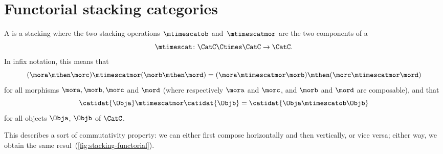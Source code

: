 
\section{Functorial stacking categories}
\label{sec:functorial-stacking}

\begin{ctdefinition}
    \label{def:functorial-stacking-cat}
    A  is a stacking  where the two stacking operations~$\mtimescatob$ and~$\mtimescatmor$ are the two components of a  \begin{equation}
        \mtimescat\colon \CatC \Ctimes \CatC \to \CatC.
    \end{equation}
    In infix notation, this means that
    \begin{equation}
        (\mora \mthen \morc )
        \mtimescatmor (\morb \mthen \mord )
        =
        (\mora \mtimescatmor \morb )
        \mthen (\morc \mtimescatmor \mord )
    \end{equation}
    for all morphisms $\mora, \morb, \morc$ and $\mord$ (where respectively $\mora$ and $\morc$, and $\morb$ and $\mord$ are composable), and that
    \begin{equation}\label{eq:functorial-stacking-condition-identities}
        \catidat{\Obja} \mtimescatmor \catidat{\Objb} = \catidat{\Obja \mtimescatob \Objb}
    \end{equation}
    for all objects $\Obja$, $\Objb$ of $\CatC$.
\end{ctdefinition}

This describes a sort of commutativity property: we can either first compose horizontally and then vertically, or vice versa; either way, we obtain the same resul~(\cref{fig:stacking-functorial}).

